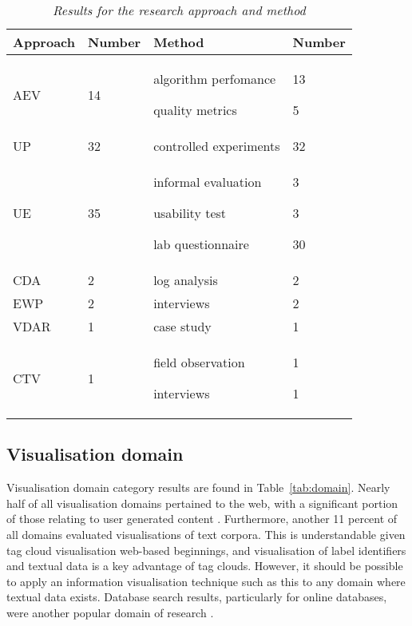\begin{table}
\centering
\caption{\textit{Results for the research approach and method}}
\begin{tabular}{|p{2cm}|x{2cm}|p{5cm}|x{2cm}|} \hline
\textbf{Approach}&\textbf{Number}&\textbf{Method}&\textbf{Number}\\ \hline
AEV	&14&algorithm perfomance\par quality metrics&13\par 5\\
UP&32&controlled experiments&32\\
UE&35&informal evaluation\par usability test\par lab questionnaire&3\par3\par30\\
CDA&2&log analysis&2\\
EWP&2&interviews&2\\
VDAR&1&case study&1\\
CTV	&1&field observation\par interviews&1\par1\\
\hline\end{tabular}
\label{tab:evaluation}
\end{table}

\subsection{Visualisation domain}

Visualisation domain category results are found in Table~\vref{tab:domain}. Nearly half of all visualisation domains pertained to the web, with a significant portion of those relating to user generated content \citep[for example][]{bateman08, halvey07, kaser07, skoutas11}. Furthermore, another 11 percent of all domains evaluated visualisations of text corpora. This is understandable given tag cloud visualisation web-based beginnings, and visualisation of label identifiers and textual data is a key advantage of tag clouds. However, it should be possible to apply an information visualisation technique  such as this to any domain where textual data exists. Database search results, particularly for online databases, were another popular domain of research \citep{Wilson11, yamamoto09}.

